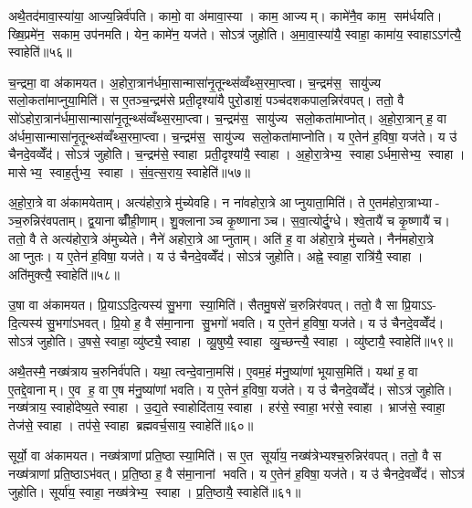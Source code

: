 अथै॒तद॑मावा॒स्या॑या॒ आज्य॒न्निर्व॑पति। कामो॒ वा अ॑मावा॒स्या। काम॒ आज्यम्। कामे॑नै॒व काम॒ सम॑र्धयति। ख्षि॒प्रमे॑न॒ सकाम॒ उप॑नमति। येन॒ कामे॑न॒ यज॑ते। सोऽत्र॑ जुहोति। अ॒मा॒वा॒स्या॑यै॒ स्वाहा॒ कामा॑य॒ स्वाहाऽऽग॑त्यै॒ स्वाहेति॑॥५६॥\anuvakamend[मि॒त्र इन्द्र॑ प्र॒जाप॑ति॒र्दश॑ द॒शाप॒ एका॑दश॒ विश्वे॒ ब्रह्म॒ दश॑दश॒ विष्णु॒स्त्रयो॑दश॒ वस॑व॒ इन्द्रो॒ऽजोऽहि॒र्वै बु॒ध्निय॑ पू॒षाऽश्विनौ॑ य॒मो दश॑ द॒शाथै॒तद॑मावा॒स्या॑या अ॒ष्टौ पञ्च॑दश]

च॒न्द्रमा॒ वा अ॑कामयत। अ॒होरा॒त्रान॑र्धमा॒सान्मासा॑नृ॒तून्थ्स॑व्वँथ्स॒रमा॒प्त्वा। च॒न्द्रम॑स॒ सायु॑ज्य सलो॒कता॑माप्नुया॒मिति॑। स ए॒तञ्च॒न्द्रम॑से प्रती॒दृश्या॑यै पुरो॒डाशं॒ पञ्च॑दशकपाल॒न्निर॑वपत्। ततो॒ वै सो॑ऽहोरा॒त्रान॑र्धमा॒सान्मासा॑नृ॒तून्थ्स॑व्वँथ्स॒रमा॒प्त्वा। च॒न्द्रम॑स॒ सायु॑ज्य सलो॒कता॑माप्नोत्। अ॒हो॒रा॒त्रान् ह॒ वा अ॑र्धमा॒सान्मासा॑नृ॒तून्थ्स॑व्वँथ्स॒रमा॒प्त्वा। च॒न्द्रम॑स॒ सायु॑ज्य सलो॒कता॑माप्नोति। य ए॒तेन॑ ह॒विषा॒ यज॑ते। य उ॑ चैनदे॒वव्वेँद॑। सोऽत्र॑ जुहोति। च॒न्द्रम॑से॒ स्वाहा प्रती॒दृश्या॑यै॒ स्वाहा। अ॒हो॒रा॒त्रेभ्य॒ स्वाहाऽर्धमा॒सेभ्य॒ स्वाहा। मासेभ्य॒ स्वाह॒र्तुभ्य॒ स्वाहा। सं॒व॒त्स॒राय॒ स्वाहेति॑॥५७॥

अ॒हो॒रा॒त्रे वा अ॑कामयेताम्। अत्य॑होरा॒त्रे मु॑च्येवहि। न ना॑वहोरा॒त्रे आप्नुयाता॒मिति॑। ते ए॒तम॑होरा॒त्राभ्या- ञ्च॒रुन्निर॑वपताम्। द्व॒यानाव्व्रीँही॒णाम्। शु॒क्लानाञ्च कृ॒ष्णानाञ्च। स॒वा॒त्योर्दु॒ग्धे। श्वे॒तायै॑ च कृ॒ष्णायै॑ च। ततो॒ वै ते अत्य॑होरा॒त्रे अ॑मुच्येते। नैने॑ अहोरा॒त्रे आप्नुताम्। अति॑ ह॒ वा अ॑होरा॒त्रे मु॑च्यते। नैन॑महोरा॒त्रे आप्नुतः। य ए॒तेन॑ ह॒विषा॒ यज॑ते। य उ॑ चैनदे॒वव्वेँद॑। सोऽत्र॑ जुहोति। अह्ने॒ स्वाहा॒ रात्रि॑यै॒ स्वाहा। अति॑मुक्त्यै॒ स्वाहेति॑॥५८॥

उ॒षा वा अ॑कामयत। प्रि॒याऽऽदि॒त्यस्य॑ सु॒भगा स्या॒मिति॑। सैतमु॒षसे॑ च॒रुन्निर॑वपत्। ततो॒ वै सा प्रि॒याऽऽ- दि॒त्यस्य॑ सु॒भगा॑ऽभवत्। प्रि॒यो ह॒ वै स॑मा॒नाना सु॒भगो॑ भवति। य ए॒तेन॑ ह॒विषा॒ यज॑ते। य उ॑ चैनदे॒वव्वेँद॑। सोऽत्र॑ जुहोति। उ॒षसे॒ स्वाहा॒ व्यु॑ष्ट्यै॒ स्वाहा। व्यू॒षुष्यै॒ स्वाहा व्यु॒च्छन्त्यै॒ स्वाहा। व्यु॑ष्टायै॒ स्वाहेति॑॥५९॥

अथै॒तस्मै॒ नख्ष॑त्राय च॒रुनिर्व॑पति। यथा॒ त्वन्दे॒वाना॒मसि॑। ए॒वम॒हं म॑नु॒ष्या॑णां भूयास॒मिति॑। यथा॑ ह॒ वा ए॒तद्दे॒वानाम्। ए॒व ह॒ वा ए॒ष म॑नु॒ष्या॑णां भवति। य ए॒तेन॑ ह॒विषा॒ यज॑ते। य उ॑ चैनदे॒वव्वेँद॑। सोऽत्र॑ जुहोति। नख्ष॑त्राय॒ स्वाहो॑देष्य॒ते स्वाहा। उ॒द्य॒ते स्वाहोदि॑ताय॒ स्वाहा। हर॑से॒ स्वाहा॒ भर॑से॒ स्वाहा। भ्राज॑से॒ स्वाहा॒ तेज॑से॒ स्वाहा। तप॑से॒ स्वाहा ब्रह्मवर्च॒साय॒ स्वाहेति॑॥६०॥

सूर्यो॒ वा अ॑कामयत। नख्ष॑त्राणां प्रति॒ष्ठा स्या॒मिति॑। स ए॒त सूर्या॑य॒ नख्ष॑त्रेभ्यश्च॒रुन्निर॑वपत्। ततो॒ वै स नख्ष॑त्राणां प्रति॒ष्ठाऽभ॑वत्। प्र॒ति॒ष्ठा ह॒ वै स॑मा॒नानां भवति। य ए॒तेन॑ ह॒विषा॒ यज॑ते। य उ॑ चैनदे॒वव्वेँद॑। सोऽत्र॑ जुहोति। सूर्या॑य॒ स्वाहा॒ नख्ष॑त्रेभ्य॒ स्वाहा। प्र॒ति॒ष्ठायै॒ स्वाहेति॑॥६१॥

